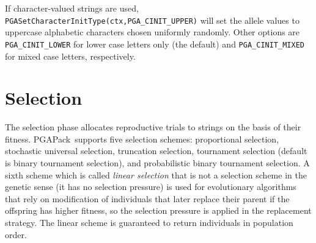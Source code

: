 \documentclass{report}
\newcommand{\pga}{PGAPack}
\begin{document}
If character-valued strings are used,
{\tt PGASetCharacterInitType(ctx,PGA\_CINIT\_UPPER)} will set the  allele values
to uppercase alphabetic characters chosen uniformly randomly.
Other options are
{\tt PGA\_CINIT\_LOWER} for lower case letters only (the default) and 
{\tt PGA\_CINIT\_MIXED} for mixed case letters, respectively.

\section{Selection}\label{sec:selection}

The selection phase allocates reproductive trials to strings on the basis of
their fitness.  \pga\ supports five selection schemes: proportional selection,
stochastic universal selection, truncation selection, tournament
selection (default is binary tournament selection), and probabilistic
binary tournament selection. A sixth scheme which is called
\textit{linear selection} that is not a selection scheme in
the genetic sense (it has no selection pressure) is used for
evolutionary algorithms that rely on modification of individuals that
later replace their parent if the offspring has higher fitness, so the
selection pressure is applied in the replacement strategy. The linear
scheme is guaranteed to return individuals in population order.
\end{document}
